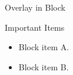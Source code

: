 \documentclass[14pt,t]{beamer}
\begin{document}
\begin{frame}{Overlay in Block}
\begin{block}{Important Items}
\begin{itemize}
\item<1-> Block item A.
\item<2-> Block item B.
\end{itemize}
\end{block}
\end{frame}
\end{document}
